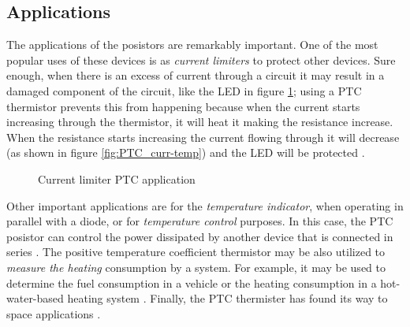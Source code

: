 \FloatBarrier \subsection{Applications}
The applications of the posistors are remarkably important. One of the most popular uses of these devices is as \textit{current limiters} to protect other devices. Sure enough, when there is an excess of current through a circuit it may result in a damaged component of the circuit, like the LED in figure \ref{fig:PTC-circuit-LED}; using a PTC thermistor prevents this from happening because when the current starts increasing through the thermistor, it will heat it making the resistance increase. When the resistance starts increasing the current flowing through it will decrease (as shown in figure \ref{fig:PTC_curr-temp}) and the LED will be protected \cite{Saburi196353}\cite{Perkins1982225}.

\begin{figure}
    \centering
    
    \caption{Current limiter PTC application}
    \label{fig:PTC-circuit-LED}
\end{figure}

Other important applications are for the \textit{temperature indicator}, when operating in parallel with a diode, or for \textit{temperature control} purposes. In this case, the PTC posistor can control the power dissipated by another device that is connected in series \cite{Saburi196353}\cite{Perkins1982225}. The positive temperature coefficient thermistor may be also utilized to \textit{measure the heating} consumption by a system. For example, it may be used to determine the fuel consumption in a vehicle or the heating consumption in a hot-water-based heating system \cite{Dostert1982159}. Finally, the PTC thermister has found its way to space applications \cite{Ishikawa1989116}.

